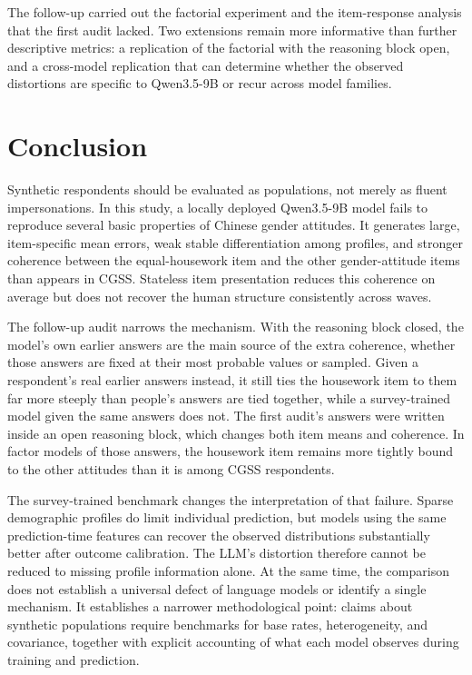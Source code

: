 \documentclass[11pt]{article}
\begin{document}
The follow-up carried out the factorial experiment and the item-response analysis that the first audit lacked. Two extensions remain more informative than further descriptive metrics: a replication of the factorial with the reasoning block open, and a cross-model replication that can determine whether the observed distortions are specific to Qwen3.5-9B or recur across model families.

\section{Conclusion}

Synthetic respondents should be evaluated as populations, not merely as fluent impersonations. In this study, a locally deployed Qwen3.5-9B model fails to reproduce several basic properties of Chinese gender attitudes. It generates large, item-specific mean errors, weak stable differentiation among profiles, and stronger coherence between the equal-housework item and the other gender-attitude items than appears in CGSS. Stateless item presentation reduces this coherence on average but does not recover the human structure consistently across waves.

The follow-up audit narrows the mechanism. With the reasoning block closed, the model's own earlier answers are the main source of the extra coherence, whether those answers are fixed at their most probable values or sampled. Given a respondent's real earlier answers instead, it still ties the housework item to them far more steeply than people's answers are tied together, while a survey-trained model given the same answers does not. The first audit's answers were written inside an open reasoning block, which changes both item means and coherence. In factor models of those answers, the housework item remains more tightly bound to the other attitudes than it is among CGSS respondents.

The survey-trained benchmark changes the interpretation of that failure. Sparse demographic profiles do limit individual prediction, but models using the same prediction-time features can recover the observed distributions substantially better after outcome calibration. The LLM's distortion therefore cannot be reduced to missing profile information alone. At the same time, the comparison does not establish a universal defect of language models or identify a single mechanism. It establishes a narrower methodological point: claims about synthetic populations require benchmarks for base rates, heterogeneity, and covariance, together with explicit accounting of what each model observes during training and prediction.



\end{document}
